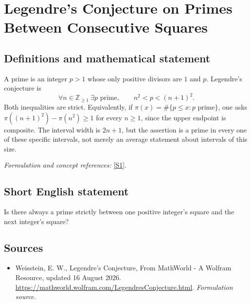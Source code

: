 \documentclass[11pt]{article}
\begin{document}
\section*{\texorpdfstring{Legendre's Conjecture on Primes Between Consecutive Squares}{Legendre's Conjecture on Primes Between Consecutive Squares}}\label{321}
\subsection{Definitions and mathematical statement}
A prime is an integer $p>1$ whose only positive divisors are $1$ and $p$. Legendre's conjecture is
\[
 \forall n\in{\mathbb{Z}}_{\ge1}\ \exists p\text{ prime},
 \qquad n^2<p<(n+1)^2.
\]
Both inequalities are strict. Equivalently, if $\pi(x)=\#\{p\le x:p\text{ prime}\}$, one asks $\pi((n+1)^2)-\pi(n^2)\ge1$ for every $n\ge1$, since the upper endpoint is composite. The interval width is $2n+1$, but the assertion is a prime in every one of these specific intervals, not merely an average statement about intervals of this size.
\par\smallskip\textit{Formulation and concept references:} \href{https://mathworld.wolfram.com/LegendresConjecture.html}{[S1]}.

\subsection{Short English statement}
Is there always a prime strictly between one positive integer's square and the next integer's square?
\subsection{Sources}
\begin{itemize}
\item[S1]Weisstein, E. W., Legendre's Conjecture, From MathWorld - A Wolfram Resource, updated 16 August 2026.
\url{https://mathworld.wolfram.com/LegendresConjecture.html}.
\textit{Formulation source.}
\end{itemize}
\end{document}
